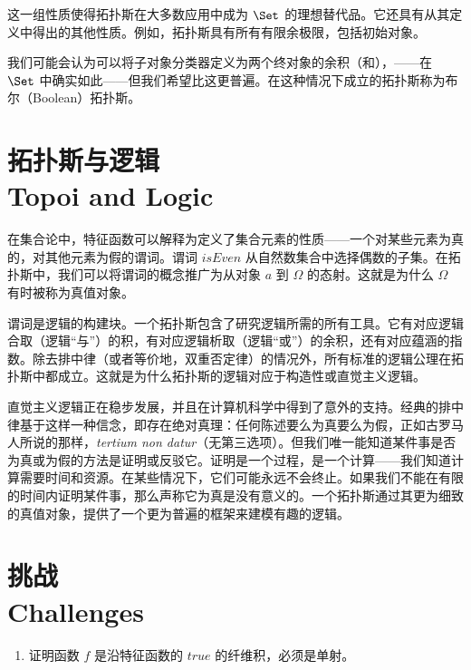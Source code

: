 这一组性质使得拓扑斯在大多数应用中成为 $\Set$ 的理想替代品。它还具有从其定义中得出的其他性质。例如，拓扑斯具有所有有限余极限，包括初始对象。

我们可能会认为可以将子对象分类器定义为两个终对象的余积（和），——在 $\Set$ 中确实如此——但我们希望比这更普遍。在这种情况下成立的拓扑斯称为布尔（Boolean）拓扑斯。

\section{拓扑斯与逻辑\\ \textmd{Topoi and Logic}}

在集合论中，特征函数可以解释为定义了集合元素的性质——一个对某些元素为真的，对其他元素为假的谓词。谓词 $\mathit{isEven}$ 从自然数集合中选择偶数的子集。在拓扑斯中，我们可以将谓词的概念推广为从对象 $a$ 到 $\Omega$ 的态射。这就是为什么 $\Omega$ 有时被称为真值对象。

谓词是逻辑的构建块。一个拓扑斯包含了研究逻辑所需的所有工具。它有对应逻辑合取（逻辑``与''）的积，有对应逻辑析取（逻辑``或''）的余积，还有对应蕴涵的指数。除去排中律（或者等价地，双重否定律）的情况外，所有标准的逻辑公理在拓扑斯中都成立。这就是为什么拓扑斯的逻辑对应于构造性或直觉主义逻辑。

直觉主义逻辑正在稳步发展，并且在计算机科学中得到了意外的支持。经典的排中律基于这样一种信念，即存在绝对真理：任何陈述要么为真要么为假，正如古罗马人所说的那样，\emph{tertium non datur}（无第三选项）。但我们唯一能知道某件事是否为真或为假的方法是证明或反驳它。证明是一个过程，是一个计算——我们知道计算需要时间和资源。在某些情况下，它们可能永远不会终止。如果我们不能在有限的时间内证明某件事，那么声称它为真是没有意义的。一个拓扑斯通过其更为细致的真值对象，提供了一个更为普遍的框架来建模有趣的逻辑。

\section{挑战\\ \textmd{Challenges}}

\begin{enumerate}
  \tightlist
  \item
  证明函数 $f$ 是沿特征函数的 $\mathit{true}$ 的纤维积，必须是单射。
\end{enumerate}
